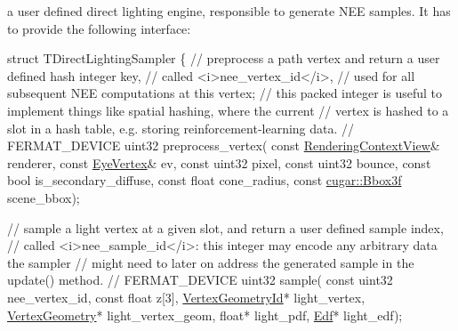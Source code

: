 \begin{DoxyParagraph}{}
\begin{DoxyEnumerate}
\item a user defined direct lighting engine, responsible to generate N\+EE samples. It has to provide the following interface\+: ~\newline

\begin{DoxyCode}
\textcolor{keyword}{struct }TDirectLightingSampler
\{
  \textcolor{comment}{// preprocess a path vertex and return a user defined hash integer key,}
  \textcolor{comment}{// called <i>nee\_vertex\_id</i>,}
  \textcolor{comment}{// used for all subsequent NEE computations at this vertex;}
  \textcolor{comment}{// this packed integer is useful to implement things like spatial hashing, where the current}
  \textcolor{comment}{// vertex is hashed to a slot in a hash table, e.g. storing reinforcement-learning data.}
  \textcolor{comment}{//}
  FERMAT\_DEVICE
  uint32 preprocess\_vertex(
      \textcolor{keyword}{const} \hyperlink{struct_rendering_context_view}{RenderingContextView}& renderer,
      \textcolor{keyword}{const} \hyperlink{struct_eye_vertex}{EyeVertex}&    ev,
      \textcolor{keyword}{const} uint32        pixel,
      \textcolor{keyword}{const} uint32        bounce,
      \textcolor{keyword}{const} \textcolor{keywordtype}{bool}          is\_secondary\_diffuse,
      \textcolor{keyword}{const} \textcolor{keywordtype}{float}         cone\_radius,
      \textcolor{keyword}{const} \hyperlink{structcugar_1_1_bbox}{cugar::Bbox3f} scene\_bbox);

  \textcolor{comment}{// sample a light vertex at a given slot, and return a user defined sample index,}
  \textcolor{comment}{// called <i>nee\_sample\_id</i>: this integer may encode any arbitrary data the sampler}
  \textcolor{comment}{// might need to later on address the generated sample in the update() method.}
  \textcolor{comment}{//}
  FERMAT\_DEVICE
  uint32 sample(
      \textcolor{keyword}{const} uint32        nee\_vertex\_id,
      \textcolor{keyword}{const} \textcolor{keywordtype}{float}         z[3],
      \hyperlink{struct_vertex_geometry_id}{VertexGeometryId}*   light\_vertex,
      \hyperlink{struct_vertex_geometry}{VertexGeometry}*     light\_vertex\_geom,
      \textcolor{keywordtype}{float}*              light\_pdf,
      \hyperlink{struct_edf}{Edf}*                light\_edf);


\end{DoxyCode}
\end{DoxyEnumerate}
\end{DoxyParagraph}
